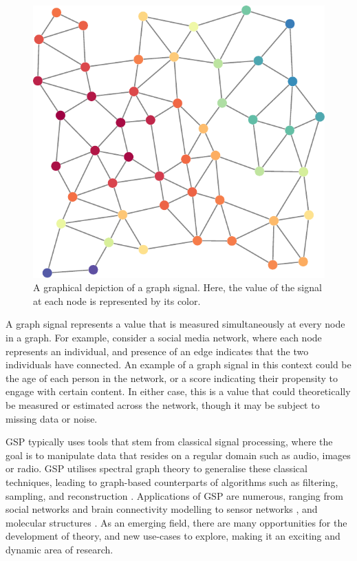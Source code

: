 \newpage

\begin{figure}
	\centering
		\includegraphics[width=\linewidth]{Figures/graph_signal_plot.pdf}
	\caption[A graphical depiction of a graph signal]{A graphical depiction of a graph signal. Here, the value of the signal at each node is represented by its color.}
	\label{fig:graph_signal}
\end{figure}
 

A graph signal represents a value that is measured simultaneously at every node in a graph. For example, consider a social media network, where each node represents an individual, and presence of an edge indicates that the two individuals have connected. An example of a graph signal in this context could be the age of each person in the network, or a score indicating their propensity to engage with certain content. In either case, this is a value that could theoretically be measured or estimated across the network, though it may be subject to missing data or noise. 

\vspace{0.2cm}

GSP typically uses tools that stem from classical signal processing, where the goal is to manipulate data that resides on a regular domain such as audio, images or radio. GSP utilises spectral graph theory to generalise these classical techniques, leading to graph-based counterparts of algorithms such as filtering, sampling, and reconstruction \citep{Shuman2013}. Applications of GSP are numerous, ranging from social networks \citep{Dong2015} and brain connectivity modelling \citep{Huang2016} to sensor networks \citep{Zhu2012}, and molecular structures \citep{Kearnes2016}. As an emerging field, there are many opportunities for the development of theory, and new use-cases to explore, making it an exciting and dynamic area of research. 

